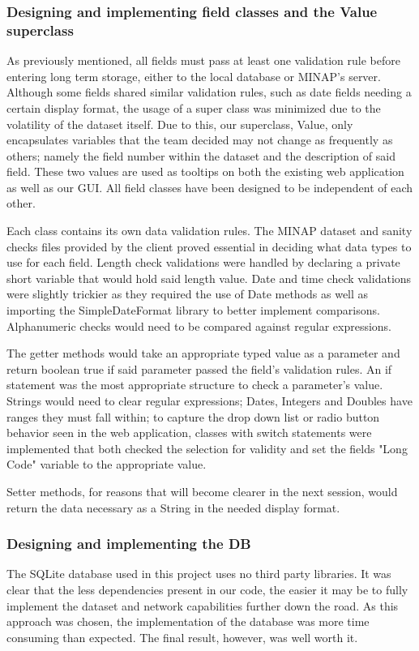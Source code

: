 \documentclass[12pt,a4paper,oneside,titlepage]{article}
\begin{document}
\subsubsection{Designing and implementing field classes and the Value superclass}
As previously mentioned, all fields must pass at least one validation rule before entering long term storage, either to the local database or MINAP's server. Although some fields shared similar validation rules, such as date fields needing a certain display format, the usage of a super class was minimized due to the volatility of the dataset itself. Due to this, our superclass, Value, only encapsulates variables that the team decided may not change as frequently as others; namely the field number within the dataset and the description of said field. These two values are used as tooltips on both the existing web application as well as our GUI. All field classes have been designed to be independent of each other.

Each class contains its own data validation rules. The MINAP dataset and sanity checks files provided by the client proved essential in deciding what data types to use for each field. Length check validations were handled by declaring a private short variable that would hold said length value. Date and time check validations were slightly trickier as they required the use of Date methods as well as importing the SimpleDateFormat library to better implement comparisons. Alphanumeric checks would need to be compared against regular expressions.

The getter methods would take an appropriate typed value as a parameter and return boolean true if said parameter passed the field's validation rules. An if statement was the most appropriate structure to check a parameter's value. Strings would need to clear regular expressions; Dates, Integers and Doubles have ranges they must fall within; to capture the drop down list or radio button behavior seen in the web application, classes with switch statements were implemented that both checked the selection for validity and set the fields "Long Code" variable to the appropriate value.

Setter methods, for reasons that will become clearer in the next session, would return the data necessary as a String in the needed display format.

\subsubsection{Designing and implementing the DB}
The SQLite database used in this project uses no third party libraries. It was clear that the less dependencies present in our code, the easier it may be to fully implement the dataset and network capabilities further down the road. As this approach was chosen, the implementation of the database was more time consuming than expected. The final result, however, was well worth it.
\end{document}
